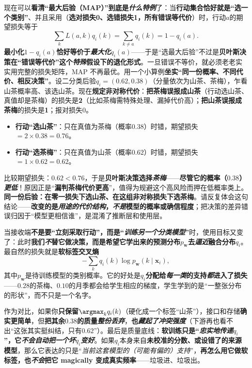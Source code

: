 现在可以\textbf{看清“最大后验（MAP）”到底是\emph{什么特例}}了：当\textbf{行动集合恰好就是“选一个类别”}、并且采用（\textbf{选对损失0、选错损失1，所有错误等代价}）时，行动$a$的期望损失等于
$$\sum_k L(a,k)q_i(k)=\sum_{k\neq a}q_i(k)=1-q_i(a).$$
\textbf{最小化}$1-q_i(a)$\textbf{恰好等价于\emph{最大化}$q_i(a)$}——于是“选最大后验”不过是\textbf{贝叶斯决策在“错误等代价”这个\emph{特殊}假设下的退化形式}。一旦错误不等价，就必须老老实实用完整的损失矩阵，MAP 不再最优。用一个小算例\textbf{坐实“同一份概率、不同代价、相反决策”}。设二分类后验$q_i=(0.62,0.38)$（分量依次为山茶、茶梅），乍看山茶概率高、该选山茶。现在\textbf{规定非对称代价}：\textbf{把茶梅误报成山茶}（行动选山茶、真值却是茶梅）的损失是\textbf{2}（比如茶梅需特殊处理、漏掉代价高）；\textbf{把山茶误报成茶梅}的损失是\textbf{1}；报对损失0。
\begin{itemize}\item \textbf{行动“选山茶”}：只在真值为茶梅（概率$0.38$）时错，期望损失$=2\times0.38=0.76$。\item \textbf{行动“选茶梅”}：只在真值为山茶（概率$0.62$）时错，期望损失$=1\times0.62=0.62$。\end{itemize}
比较期望损失：$0.62<0.76$，于是\textbf{贝叶斯决策选择\emph{茶梅}}——\textbf{尽管它的概率（$0.38$）\emph{更低}}！原因正是“\textbf{漏判茶梅代价更高}”，值得为规避这个高风险而押在低概率类上。\textbf{同一份后验：在零一损失下选山茶、在这组非对称损失下选茶梅}。请反复体会这句结论——\textbf{改变的是\emph{用途的代价结构}，\emph{不是}模型的概率或确信程度}；把决策的差异错误归因于“模型更相信谁”，是混淆了推断层和使用层。

当接收端\textbf{不是要“立刻采取行动”，而是“\emph{训练另一个分类模型}”}时，使用目标又变了：此时\textbf{我们\emph{不}替它做决策，而是希望它学出来的预测分布$p_{\bm{w}}$去\emph{逼近}融合分布$q_i$}。最自然的损失就是\textbf{软标签交叉熵}
$$-\sum_k q_i(k)\log p_{\bm{w}}(k\mid\bm{x}_i),$$
其中$p_{\bm{w}}$是待训练模型的类别概率。它的好处是\textbf{$q_i$分配给\emph{每一类}的支持\emph{都}进入了损失}——$0.28$的茶梅、$0.10$的月季都会给学生相应的梯度，学生学到的是“一整张分布的形状”，而不只是一个名字。

作为对比，如果你\textbf{只保留$\argmax_k q_i(k)$}（硬化成一个标签“山茶”），接口和存储\textbf{确实更简单}，但\textbf{把其余$0.38$的质量\emph{整份丢弃}}，\textbf{也\emph{藏起了冲突强度}}（下游再也看不出“这张其实挺纠结，只有$0.62$”）。最后是质量底线：\textbf{软训练只是“\emph{忠实地传递}$q_i$”，它\emph{不会自动把一个坏$q_i$变好}}。如果$q_i$本身来自\textbf{未校准的分数、或设错了的来源模型}，那么它表达的只是“\emph{当前这套模型的（可能有偏的）支持}”，\textbf{再怎么用它做软标签，也\emph{不会}把它 magically 变成真实频率}——垃圾进、垃圾出。

